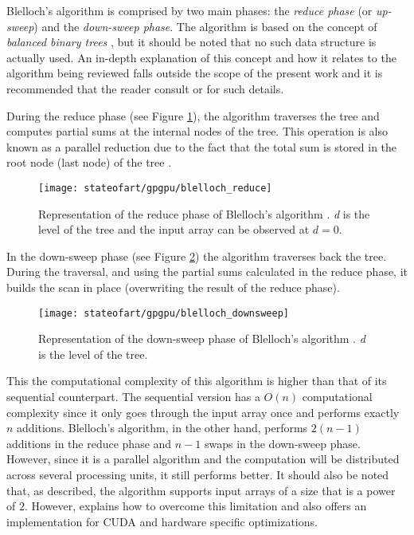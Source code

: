 Blelloch's algorithm is comprised by two main phases: the \emph{reduce phase} (or \emph{up-sweep}) and the \emph{down-sweep phase}.
The algorithm is based on the concept of \emph{balanced binary trees} \cite{Harris2007}, but it should be noted that no such data structure is actually used.
An in-depth explanation of this concept and how it relates to the algorithm being reviewed falls outside the scope of the present work and it is recommended that the reader consult \cite{Harris2007} or \cite{Blelloch1990} for such details.

During the reduce phase (see Figure \ref{fig:scan reduce}), the algorithm traverses the tree and computes partial sums at the internal nodes of the tree.
This operation is also known as a parallel reduction due to the fact that the total sum is stored in the root node (last node) of the tree \cite{Harris2007}.

\begin{figure}[hbtp]
\centering
\texttt{[image: stateofart/gpgpu/blelloch\_reduce]}
\caption{Representation of the reduce phase of Blelloch's algorithm \cite{Harris2007}. \emph{d} is the level of the tree and the input array can be observed at $d=0$.}
\label{fig:scan reduce}
\end{figure}

In the down-sweep phase (see Figure \ref{fig:scan down-sweep}) the algorithm traverses back the tree.
During the traversal, and using the partial sums calculated in the reduce phase, it builds the scan in place (overwriting the result of the reduce phase).

\begin{figure}[hbtp]
\centering
\texttt{[image: stateofart/gpgpu/blelloch\_downsweep]}
\caption{Representation of the down-sweep phase of Blelloch's algorithm \cite{Harris2007}. \emph{d} is the level of the tree.}
\label{fig:scan down-sweep}
\end{figure}

This the computational complexity of this algorithm is higher than that of its sequential counterpart.
The sequential version has a $O(n)$ computational complexity since it only goes through the input array once and performs exactly $n$ additions.
Blelloch's algorithm, in the other hand, performs $2(n-1)$ additions in the reduce phase and $n-1$ swaps in the down-sweep phase.
However, since it is a parallel algorithm and the computation will be distributed across several processing units, it still performs better.
It should also be noted that, as described, the algorithm supports input arrays of a size that is a power of $2$.
However, \cite{Harris2007} explains how to overcome this limitation and also offers an implementation for CUDA and hardware specific optimizations.

